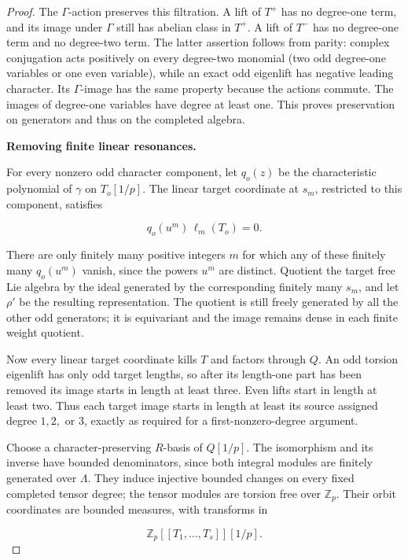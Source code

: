 \begin{proof}
The \(\Gamma\)-action preserves this filtration. A lift of \(T^+\) has no degree-one term, and its image under \(\Gamma\) still has abelian class in \(T^+\). A lift of \(T^-\) has no degree-one term and no degree-two term. The latter assertion follows from parity: complex conjugation acts positively on every degree-two monomial (two odd degree-one variables or one even variable), while an exact odd eigenlift has negative leading character. Its \(\Gamma\)-image has the same property because the actions commute. The images of degree-one variables have degree at least one. This proves preservation on generators and thus on the completed algebra.

\par\medskip\noindent\textbf{Removing finite linear resonances.}

For every nonzero odd character component, let \(q_o(z)\) be the characteristic polynomial of \(\gamma\) on \(T_o[1/p]\). The linear target coordinate at \(s_m\), restricted to this component, satisfies

\[
q_o(u^m)\,\ell_m(T_o)=0.
\]

There are only finitely many positive integers \(m\) for which any of these finitely many \(q_o(u^m)\) vanish, since the powers \(u^m\) are distinct. Quotient the target free Lie algebra by the ideal generated by the corresponding finitely many \(s_m\), and let \(\rho'\) be the resulting representation. The quotient is still freely generated by all the other odd generators; it is equivariant and the image remains dense in each finite weight quotient.

Now every linear target coordinate kills \(T\) and factors through \(Q\). An odd torsion eigenlift has only odd target lengths, so after its length-one part has been removed its image starts in length at least three. Even lifts start in length at least two. Thus each target image starts in length at least its source assigned degree \(1,2,\) or \(3\), exactly as required for a first-nonzero-degree argument.

Choose a character-preserving \(R\)-basis of \(Q[1/p]\). The isomorphism and its inverse have bounded denominators, since both integral modules are finitely generated over \(\Lambda\). They induce injective bounded changes on every fixed completed tensor degree; the tensor modules are torsion free over \(\mathbb Z_p\). Their orbit coordinates are bounded measures, with transforms in

\[
\mathbb Z_p[[T_1,\ldots,T_s]][1/p].
\]


\end{proof}
